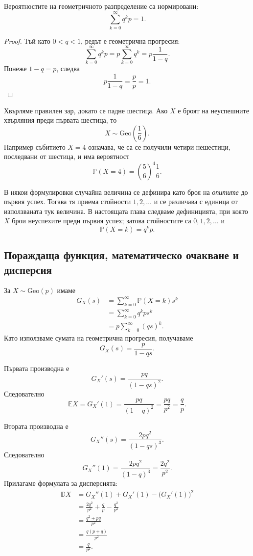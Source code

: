 \begin{prop}
Вероятностите на геометричното разпределение са нормировани:
\[
\sum_{k=0}^{\infty}q^kp=1.
\]
\end{prop}

\begin{proof}
Тъй като $0<q<1$, редът е геометрична прогресия:
\[
\sum_{k=0}^{\infty}q^kp
=
p\sum_{k=0}^{\infty}q^k
=
p\frac{1}{1-q}.
\]
Понеже $1-q=p$, следва
\[
p\frac{1}{1-q}=\frac{p}{p}=1.
\]
\end{proof}

\begin{example}
Хвърляме правилен зар, докато се падне шестица. Ако $X$ е броят на неуспешните хвърляния преди първата шестица, то
\[
X\sim\mathrm{Geo}\left(\frac16\right).
\]
Например събитието $X=4$ означава, че са се получили четири нешестици, последвани от шестица, и има вероятност
\[
\mathbb{P}(X=4)
=
\left(\frac56\right)^4\frac16.
\]
\end{example}

\begin{supp}[Бележка]
В някои формулировки случайна величина се дефинира като броя на \emph{опитите} до първия успех. Тогава тя приема стойности $1,2,\ldots$ и се различава с единица от използваната тук величина. В настоящата глава следваме дефиницията, при която $X$ брои неуспехите преди първия успех; затова стойностите са $0,1,2,\ldots$ и
\[
\mathbb{P}(X=k)=q^kp.
\]
\end{supp}

\subsection{Пораждаща функция, математическо очакване и дисперсия}\label{s:35.4.2}

За $X\sim\mathrm{Geo}(p)$ имаме
\[
\begin{aligned}
G_X(s)
&=\sum_{k=0}^{\infty}\mathbb{P}(X=k)s^k\\
&=\sum_{k=0}^{\infty}q^kps^k\\
&=p\sum_{k=0}^{\infty}(qs)^k.
\end{aligned}
\]
Като използваме сумата на геометрична прогресия, получаваме
\[
G_X(s)=\frac{p}{1-qs}.
\]

Първата производна е
\[
G_X'(s)=\frac{pq}{(1-qs)^2}.
\]
Следователно
\[
\mathbb{E}X
=
G_X'(1)
=
\frac{pq}{(1-q)^2}
=
\frac{pq}{p^2}
=
\frac{q}{p}.
\]

Втората производна е
\[
G_X''(s)=\frac{2pq^2}{(1-qs)^3}.
\]
Следователно
\[
G_X''(1)=\frac{2pq^2}{(1-q)^3}
=\frac{2q^2}{p^2}.
\]
Прилагаме формулата за дисперсията:
\[
\begin{aligned}
\mathbb{D}X
&=G_X''(1)+G_X'(1)-\bigl(G_X'(1)\bigr)^2\\
&=\frac{2q^2}{p^2}+\frac{q}{p}-\frac{q^2}{p^2}\\
&=\frac{q^2+pq}{p^2}\\
&=\frac{q(p+q)}{p^2}\\
&=\frac{q}{p^2}.
\end{aligned}
\]

